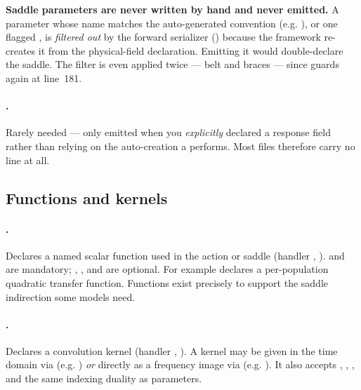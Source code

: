 \begin{gotcha}
\textbf{Saddle parameters are never written by hand and never emitted.} A
parameter whose name matches the auto-generated  convention
(e.g. ), or one flagged , is \emph{filtered out} by
the forward serializer () because the
framework re-creates it from the physical-field declaration. Emitting it would
double-declare the saddle. The filter is even applied twice --- belt and braces ---
since  guards  again at line~181.
\end{gotcha}

\paragraph{.} Rarely needed --- only emitted
when you \emph{explicitly} declared a response field rather than relying on the
auto-creation a  performs. Most files therefore carry
no  line at all.

\subsection{Functions and kernels}

\paragraph{.} Declares
a named scalar function used in the action or saddle (handler
, ). 
and  are mandatory; , , and
 are optional. For example
declares a per-population quadratic transfer function. Functions exist precisely
to support the saddle indirection some models need.

\paragraph{.} Declares a convolution kernel (handler
, ). A kernel may be
given in the time domain via  (e.g.
) \emph{or} directly as
a frequency image via  (e.g.
). It also accepts ,
, , and the same indexing duality as
parameters.


